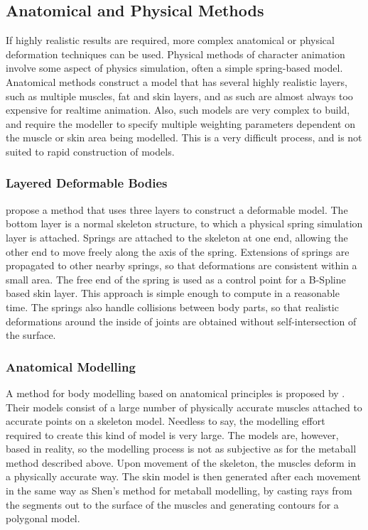 \subsection{\label{sec:litreview:animation:physics}Anatomical and Physical Methods}
If highly realistic results are required, more complex anatomical or physical deformation techniques can be used. Physical methods of character animation involve some aspect of physics simulation, often a simple spring-based model. Anatomical methods construct a model that has several highly realistic layers, such as multiple muscles, fat and skin layers, and as such are almost always too expensive for realtime animation. Also, such models are very complex to build, and require the modeller to specify multiple weighting parameters dependent on the muscle or skin area being modelled. This is a very difficult process, and is not suited to rapid construction of models.

\subsubsection{\label{sec:litreview:animation:physics:layered}Layered Deformable Bodies}
\citet{Gascuel91} propose a method that uses three layers to construct a deformable model. The bottom layer is a normal skeleton structure, to which a physical spring simulation layer is attached. Springs are attached to the skeleton at one end, allowing the other end to move freely along the axis of the spring. Extensions of springs are propagated to other nearby springs, so that deformations are consistent within a small area. The free end of the spring is used as a control point for a B-Spline based skin layer. This approach is simple enough to compute in a reasonable time. The springs also handle collisions between body parts, so that realistic deformations around the inside of joints are obtained without self-intersection of the surface.

\subsubsection{\label{sec:litreview:animation:physics:anatomical}Anatomical Modelling}
A method for body modelling based on anatomical principles is proposed by \citet{Nedel98}. Their models consist of a large number of physically accurate muscles attached to accurate points on a skeleton model. Needless to say, the modelling effort required to create this kind of model is very large. The models are, however, based in reality, so the modelling process is not as subjective as for the metaball method described above. Upon movement of the skeleton, the muscles deform in a physically accurate way. The skin model is then generated after each movement in the same way as Shen's method for metaball modelling, by casting rays from the segments out to the surface of the muscles and generating contours for a polygonal model.

